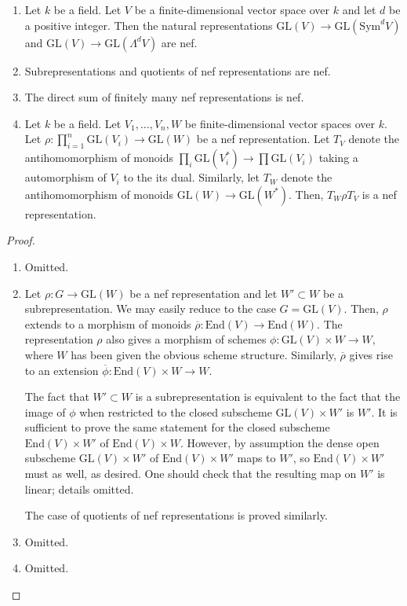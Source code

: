 \begin{lemma}
\label{semipos_rep_examples}
\begin{enumerate}
\item\label{sym_and_wedge_semipos} Let $k$ be a field.
Let $V$ be a finite-dimensional vector space over $k$ and let $d$ be a positive
integer.
Then the natural representations
$\mathrm{GL}(V) \to \mathrm{GL}(\mathrm{Sym}^dV)$ and
$\mathrm{GL}(V) \to \mathrm{GL}(\Lambda^dV)$
are nef.
\item\label{subreps_and_quotients_semipos} Subrepresentations and quotients of
  nef representations are nef.
\item The direct sum of finitely many nef representations is
  nef.
\item
Let $k$ be a field.
Let $V_1,\ldots,V_n,W$ be finite-dimensional vector spaces over $k$.
Let $\rho:\prod_{i=1}^{n}\mathrm{GL}(V_i)\rightarrow \mathrm{GL}(W)$ be a
nef representation.
Let $T_V$ denote the antihomomorphism of monoids
$\prod_i\mathrm{GL}(V_i^*)\to\prod\mathrm{GL}(V_i)$ taking a automorphism of
$V_i$ to the its dual.
Similarly, let $T_W$ denote the antihomomorphism of monoids
$\mathrm{GL}(W)\to\mathrm{GL}(W^*)$.
Then, $T_W\rho T_V$ is a nef representation.
\end{enumerate}
\end{lemma}

\begin{proof}
\begin{enumerate}
\item Omitted.
\item Let $\rho:G\to \mathrm{GL}(W)$ be a nef representation and let
$W'\subset W$ be a subrepresentation.
We may easily reduce to the case $G=\mathrm{GL}(V)$.
Then, $\rho$ extends to a morphism of monoids
$\overline{\rho}:\mathrm{End}(V)\to \mathrm{End}(W)$.
The representation $\rho$ also gives a morphism of schemes
$\phi:\mathrm{GL}(V)\times W\to W$, where $W$ has been given the obvious scheme
structure.
Similarly, $\overline{\rho}$ gives rise to an extension
$\overline{\phi}:\mathrm{End}(V)\times W\to W$.

The fact that $W'\subset W$ is a subrepresentation is equivalent to the fact
that the image of $\phi$ when restricted to the closed subscheme
$\mathrm{GL}(V)\times W'$ is $W'$.
It is sufficient to prove the same statement for the closed subscheme
$\mathrm{End}(V)\times W'$ of $\mathrm{End}(V)\times W$.
However, by assumption the dense open subscheme $\mathrm{GL}(V)\times W'$ of
$\mathrm{End}(V)\times W'$ maps to $W'$, so $\mathrm{End}(V)\times W'$ must as
well, as desired. One should check that the resulting map on $W'$ is linear;
details omitted.

The case of quotients of nef representations is proved similarly.
\item Omitted.
\item Omitted.
\end{enumerate}
\end{proof}


